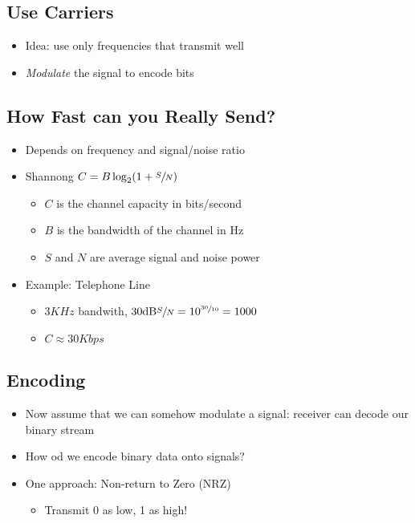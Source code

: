 \subsection{Use Carriers}
\begin{itemize}[nosep]
    \item Idea: use only frequencies that transmit well
    \item \emph{Modulate} the signal to encode bits
\end{itemize}

\subsection{How Fast can you Really Send?}
\begin{itemize}[nosep]
    \item Depends on frequency and signal/noise ratio
    \item Shannong $C=B\log_2(1+\sfrac{S}{N})$
          \begin{itemize}[nosep]
              \item $C$ is the channel capacity in bits/second
              \item $B$ is the bandwidth of the channel in \si{Hz}
              \item $S$ and $N$ are average signal and noise power
          \end{itemize}
    \item Example: Telephone Line
          \begin{itemize}[nosep]
              \item $3\si{KHz}$ bandwith, $30\si{dB}\sfrac{S}{N} = 10^{\sfrac{30}{10}} = 1000$
              \item $C\approx 30\si{Kbps}$
          \end{itemize}
\end{itemize}

\subsection{Encoding}
\begin{itemize}[nosep]
    \item Now assume that we can somehow modulate a signal: receiver can decode our binary stream
    \item How od we encode binary data onto signals?
    \item One approach: Non-return to Zero (NRZ)
          \begin{itemize}[nosep]
              \item Transmit 0 as low, 1 as high!
          \end{itemize}
\end{itemize}

